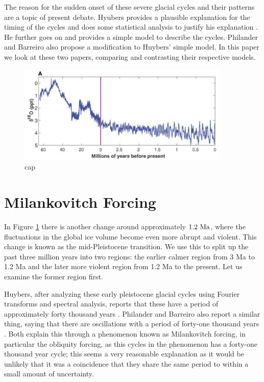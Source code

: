 \documentclass[11pt]{article}
\begin{document}
The reason for the sudden onset of these severe glacial cycles and their patterns are a topic of present debate.
Hyubers provides a plausible explanation for the timing of the cycles and does some statistical analysis to justify his explanation \cite{huybers}.
He further goes on and provides a simple model to describe the cycles.
Philander and Barreiro also propose a modification to Huybers' simple model.
In this paper we look at these two papers, comparing and contrasting their respective models.

\begin{figure}
  \centering
  \includegraphics[width=4in]{d18o.png}
  \caption{cap}
  \label{d18o}
\end{figure}

\section{Milankovitch Forcing}
In Figure \ref{d18o} there is another change around approximately $1.2~\textnormal{Ma}$, where the fluctuations in the global ice volume become even more abrupt and violent.
This change is known as the mid-Pleistocene transition.
We use this to split up the past three million years into two regions: the earlier calmer region from 3 Ma to 1.2 Ma and the later more violent region from 1.2 Ma to the present.
Let us examine the former region first.

Huybers, after analyzing these early pleistocene glacial cycles using Fourier transforms and spectral analysis, reports that these have a period of approximately forty thousand years \cite{huybers}.
Philander and Barreiro also report a similar thing, saying that there are oscillations with a period of forty-one thousand years \cite{philander}.
Both explain this through a phenomenon known as Milankovitch forcing, in particular the obliquity forcing, as this cycles in the phenomenon has a forty-one thousand year cycle; this seems a very reasonable explanation as it would be unlikely that it was a coincidence that they share the same period to within a small amount of uncertainty.
\end{document}
